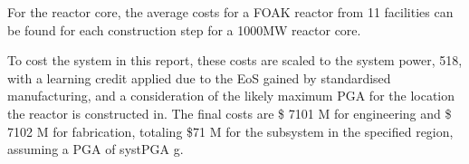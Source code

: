 For the reactor core, the average costs for a FOAK reactor from 11 facilities can be found for each construction step for a 1000MW reactor core.

To cost the system in this report, these costs are scaled to the system power, 518, with a learning credit applied due to the EoS gained by standardised manufacturing, and a consideration of the likely maximum PGA for the location the reactor is constructed in. The final costs are \$ 7101 M for engineering and \$ 7102 M for fabrication, totaling \$71 M for the subsystem in the specified region, assuming a PGA of systPGA g.

